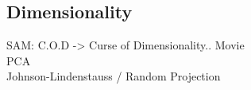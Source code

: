 \subsection{Dimensionality}
SAM: C.O.D -> Curse of Dimensionality.. Movie \\
	PCA\\
           Johnson-Lindenstauss / Random Projection \\
